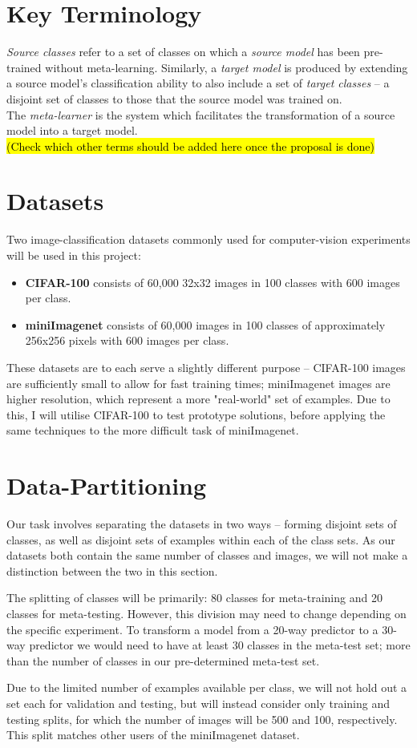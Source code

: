 \documentclass{report}
\newcommand{\TODO}[1]{\sethlcolor{pink}\hl{\\(#1)\\}}
\begin{document}
	\section{Key Terminology}
	\textit{Source classes} refer to a set of classes on which a \textit{source model} has been pre-trained without meta-learning. Similarly, a \textit{target model} is produced by extending a source model's classification ability to also include a set of \textit{target classes} -- a disjoint set of classes to those that the source model was trained on. \\
	The \textit{meta-learner} is the system which facilitates the transformation of a source model into a target model. 
	\TODO{Check which other terms should be added here once the proposal is done}
	
	\section{Datasets}
	Two image-classification datasets commonly used for computer-vision experiments will be used in this project:
	\begin{itemize}
		\item \textbf{CIFAR-100}\parencite{cifar100} consists of 60,000 32x32 images in 100 classes with 600 images per class. 
		\item \textbf{miniImagenet}\parencite{ilsvr} consists of 60,000 images in 100 classes of approximately 256x256 pixels with 600 images per class.
	\end{itemize}
	These datasets are to each serve a slightly different purpose -- CIFAR-100 images are sufficiently small to allow for fast training times; miniImagenet images are higher resolution, which represent a more "real-world" set of examples. Due to this, I will utilise CIFAR-100 to test prototype solutions, before applying the same techniques to the more difficult task of miniImagenet. \par 

	\section{Data-Partitioning}
	Our task involves separating the datasets in two ways -- forming disjoint sets of classes, as well as disjoint sets of examples within each of the class sets. As our datasets both contain the same number of classes and images, we will not make a distinction between the two in this section. \par
	The splitting of classes will be primarily: 80 classes for meta-training and 20 classes for meta-testing. However, this division may need to change depending on the specific experiment. To transform a model from a 20-way predictor to a 30-way predictor we would need to have at least 30 classes in the meta-test set; more than the number of classes in our pre-determined meta-test set. \par
	Due to the limited number of examples available per class, we will not hold out a set each for validation and testing, but will instead consider only training and testing splits, for which the number of images will be 500 and 100, respectively. This split matches other users of the miniImagenet dataset. \par
	
\end{document}
